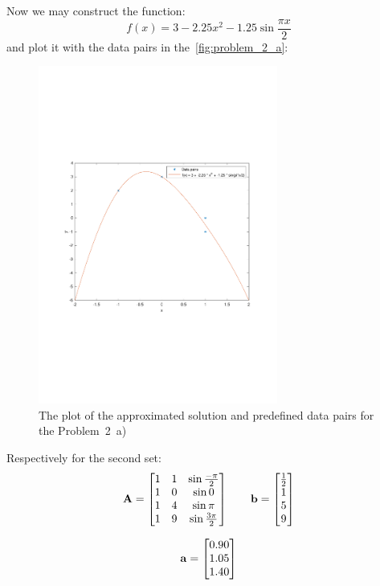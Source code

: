 Now we may construct the function:
\begin{equation*}
  f(x)=3-2.25x^2-1.25\sin{\frac{\pi{}x}{2}}
\end{equation*}
and plot it with the data pairs in the~\autoref{fig:problem_2_a}:

\begin{figure}[h]
  \centering
  \includegraphics[width=0.7\textwidth]{images/Problem_2_a_plot.pdf}
  \caption{The plot of the approximated solution and predefined data pairs
    for the Problem~2~a)}\label{fig:problem_2_a}
\end{figure}

Respectively for the second set:
\begin{equation*}
  \mathbf{A} = \begin{bmatrix}
    1 & 1 & \sin{\frac{-\pi}{2}} \\
    1 & 0 & \sin{0} \\
    1 & 4 & \sin{\pi} \\
    1 & 9 & \sin{\frac{3\pi}{2}}
  \end{bmatrix} \qquad
  \mathbf{b} = \begin{bmatrix}
    \frac{1}{2} \\
    1 \\
    5 \\
    9
  \end{bmatrix}
\end{equation*}

\begin{equation*}
  \mathbf{a} = \begin{bmatrix}
    0.90 \\
    1.05 \\
    1.40
  \end{bmatrix}
\end{equation*}

